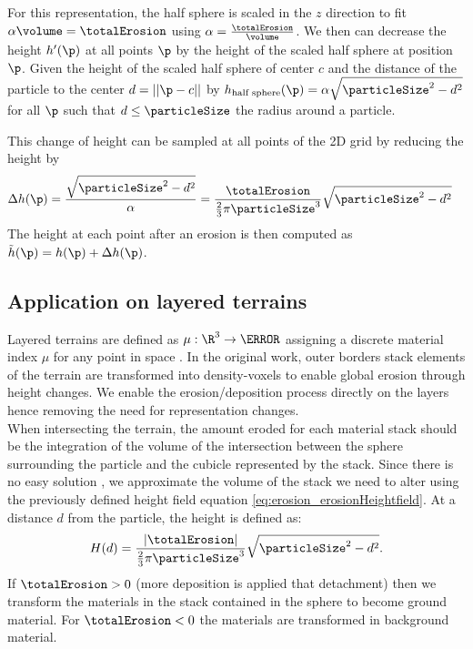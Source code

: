 For this representation, the half sphere is scaled in the $z$ direction to fit $\alpha \volume = \totalErosion$ using $\alpha = \frac{\totalErosion}{\volume}$. We then can decrease the height $h'(\p)$ at all points $\p$ by the height of the scaled half sphere at position $\p$. Given the height of the scaled half sphere of center $c$ and the distance of the particle to the center $d = ||\p - c||$ by $h_\text{half sphere}(\p) = \alpha \sqrt{\particleSize^2 - d^2}$ for all $\p$ such that $d \leq \particleSize$ the radius around a particle.

This change of height can be sampled at all points of the 2D grid by reducing the height by 
\begin{align} 
\label{eq:erosion_erosionHeightfield}
\Delta h(\p) &= \frac{\sqrt{\particleSize^2 - d^2}}{\alpha} = \frac{\totalErosion}{\frac{2}{3} \pi \particleSize^3} \sqrt{\particleSize^2 - d^2}
\end{align}
The height at each point after an erosion is then computed as $\Tilde{h}(\p) = h(\p) + \Delta h(\p)$.

\subsection{Application on layered terrains}
\label{sec:erosion_application_on_layers}
Layered terrains are defined as $\mu: \R^3 \to \N$ assigning a discrete material index $\mu$ for any point in space \cite{Benes2001, Peytavie2009}. In the original work, outer borders stack elements of the terrain are transformed into density-voxels to enable global erosion through height changes. We enable the erosion/deposition process directly on the layers hence removing the need for representation changes. \\ 
When intersecting the terrain, the amount eroded for each material stack should be the integration of the volume of the intersection between the sphere surrounding the particle and the cubicle represented by the stack. Since there is no easy solution \cite{Jones2017}, we approximate the volume of the stack we need to alter using the previously defined height field equation \eqref{eq:erosion_erosionHeightfield}. 
At a distance $d$ from the particle, the height is defined as:
\begin{align} \label{eq:erosion_erosionLayers}
H(d) = \frac{|\totalErosion|}{\frac{2}{3} \pi \particleSize^3} \sqrt{\particleSize^2 - d^2}.
\end{align}
If $\totalErosion > 0$ (more deposition is applied that detachment) then we transform the materials in the stack contained in the sphere to become ground material. For $\totalErosion < 0$ the materials are transformed in background material.

